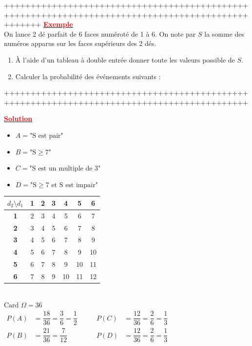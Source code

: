 \documentclass[12pt,a4paper]{article}
\begin{document}
+++++++++++++++++++++++++++++++++++++++++++++++++++++++++++++++++++++++++++++++++++++++++++++++++++
\newpage
\underline{\textbf{\textcolor{red}{Exemple}}}\\
On lance 2 dé parfait de 6 faces numéroté de 1 à 6. On note par $S$ la somme des numéros apparus sur les faces supérieurs des 2 dés.
\begin{enumerate}
    \item À l'aide d'un tableau à double entrée donner toute les valeurs possible de $S$.
    \item Calculer la probabilité des événements suivants :
\end{enumerate}

++++++++++++++++++++++++++++++++++++++++++++++++++++++++++++++++++++++++++++++++++++++++++++

\underline{\textbf{\textcolor{red}{Solution}}}\\
\begin{itemize}
    \item $A = \text{"S est pair"}$
    \item $B = \text{"S} \geqslant 7\text{"}$
    \item $C = \text{"S est un multiple de 3"}$
    \item $D = \text{"S} \geqslant 7 \text{ et S est impair"}$
\end{itemize}

\begin{tabular}{|c|c|c|c|c|c|c|}
\hline
$d_2 \setminus d_1$ & \textbf{1} & \textbf{2} & \textbf{3} & \textbf{4} & \textbf{5} & \textbf{6} \\ \hline
\textbf{1} & 2 & 3 & 4 & 5 & 6 & 7 \\ \hline
\textbf{2} & 3 & 4 & 5 & 6 & 7 & 8 \\ \hline
\textbf{3} & 4 & 5 & 6 & 7 & 8 & 9 \\ \hline
\textbf{4} & 5 & 6 & 7 & 8 & 9 & 10 \\ \hline
\textbf{5} & 6 & 7 & 8 & 9 & 10 & 11 \\ \hline
\textbf{6} & 7 & 8 & 9 & 10 & 11 & 12 \\ \hline
\end{tabular}\\

$\text{Card } \Omega = 36$\\

$
\begin{aligned}
    P(A) &= \dfrac{18}{36} = \dfrac{3}{6} = \dfrac{1}{2} \qquad & P(C) &= \dfrac{12}{36} = \dfrac{2}{6} = \dfrac{1}{3} \\
    P(B) &= \dfrac{21}{36} = \dfrac{7}{12} \qquad & P(D) &= \dfrac{12}{36} = \dfrac{2}{6} = \dfrac{1}{3}
\end{aligned}$
\end{document}
